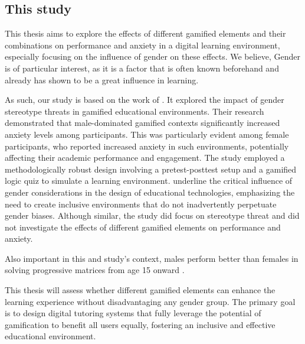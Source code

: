 \subsection{This study}
This thesis aims to explore the effects of different gamified elements and their combinations on performance and anxiety in a digital learning environment, especially focusing on the influence of gender on these effects.
We believe, Gender is of particular interest, as it is a factor that is often known beforehand and already has shown to be a great influence in learning.

As such, our study is based on the work of \textcite{albuquerqueDoesGenderStereotype2017}.
It explored the impact of gender stereotype threats in gamified educational environments.
Their research demonstrated that male-dominated gamified contexts significantly increased anxiety levels among participants.
This was particularly evident among female participants, who reported increased anxiety in such environments, potentially affecting their academic performance and engagement.
The study employed a methodologically robust design involving a pretest-posttest setup and a gamified logic quiz to simulate a learning environment.
\textcite{albuquerqueDoesGenderStereotype2017} underline the critical influence of gender considerations in the design of educational technologies, emphasizing the need to create inclusive environments that do not inadvertently perpetuate gender biases. 
Although similar, the study did focus on stereotype threat and did not investigate the effects of different gamified elements on performance and anxiety.

Also important in this and \textcite{albuquerqueDoesGenderStereotype2017} study's context, males perform better than females in solving progressive matrices from age 15 onward \parencite{lynnSexDifferencesProgressive2004}.

This thesis will assess whether different gamified elements can enhance the learning experience without disadvantaging any gender group.
The primary goal is to design digital tutoring systems that fully leverage the potential of gamification to benefit all users equally, fostering an inclusive and effective educational environment.
